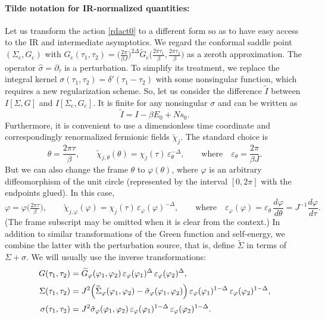 \documentclass[12pt]{article}
\newcommand{\cc}{\mathrm{c}}
\newcommand{\tI}{\tilde{I}}
\newcommand{\tG}{\widetilde{G}}
\newcommand{\tSig}{\widetilde{\Sigma}}
\newcommand{\tsig}{\tilde{\sigma}}
\newcommand{\vep}{\varepsilon}
\newcommand{\vp}{\varphi}
\begin{document}
\paragraph{Tilde notation for IR-normalized quantities:}
Let us transform the action \eqref{rdact0} to a different form so as to have easy access to the IR and intermediate asymptotics. We regard the conformal saddle point $(\Sigma_{\cc},G_{\cc})$ with $G_{\cc}(\tau_1,\tau_2)=\bigl(\frac{2\pi}{\beta J}\bigr)^{2\Delta}
\tG_{\cc}\bigl(\frac{2\pi\tau_1}{\beta},\frac{2\pi\tau_2}{\beta}\bigr)$ as a zeroth approximation. The operator $\hat{\sigma}=\partial_\tau$ is a perturbation. To simplify its treatment, we replace the integral kernel $\sigma(\tau_1,\tau_2)=\delta'(\tau_1-\tau_2)$ with some nonsingular function, which requires a new regularization scheme. So, let us consider the difference $\tI$ between $I[\Sigma,G]$ and $I[\Sigma_{\cc},G_{\cc}]$. It is finite for any nonsingular $\sigma$ and can be written as
\begin{equation}
\tI=I-\beta E_0+N s_0.
\end{equation}
Furthermore, it is convenient to use a dimensionless time coordinate and correspondingly renormalized fermionic fields $\widetilde{\chi}_{j}$. The standard choice is
\begin{equation}\label{theta_frame}
\theta=\frac{2\pi\tau}{\beta},\qquad
\widetilde{\chi}_{j,\theta}(\theta)=\chi_j(\tau)\,\vep_{\theta}^{-\Delta},\qquad
\text{where}\quad \vep_{\theta}=\frac{2\pi}{\beta J}.
\end{equation}
But we can also change the frame $\theta$ to $\vp(\theta)$, where $\vp$ is an arbitrary diffeomorphism of the unit circle (represented by the interval $[0,2\pi]$ with the endpoints glued). In this case,
\begin{equation}
\vp=\vp\bigl(\tfrac{2\pi\tau}{\beta}\bigr),\qquad
\widetilde{\chi}_{j,\vp}(\vp)=\chi_j(\tau)\,\vep_{\vp}(\vp)^{-\Delta},\qquad
\text{where}\quad
\vep_{\vp}(\vp)=\vep_{\theta}\,\frac{d\vp}{d\theta}=J^{-1}\frac{d\vp}{d\tau}.
\end{equation}
(The frame subscript may be omitted when it is clear from the context.) In addition to similar transformations of the Green function and self-energy, we combine the latter with the perturbation source, that is, define $\tSig$ in terms of $\Sigma+\sigma$. We will usually use the inverse transformations:
\begin{equation} \label{tquan}
\begin{aligned}
G(\tau_1,\tau_2) &=\tG_{\vp}(\vp_1,\vp_2)\,
\vep_{\vp}(\vp_1)^{\Delta}\,\vep_{\vp}(\vp_2)^{\Delta},
\\[2pt]
\Sigma(\tau_1,\tau_2)
&=J^2\Bigl(\tSig_{\vp}(\vp_1,\vp_2)-\tsig_{\vp}(\vp_1,\vp_2)\Bigr)\,
\vep_{\vp}(\vp_1)^{1-\Delta}\,\vep_{\vp}(\vp_2)^{1-\Delta},
\\[2pt]
\sigma(\tau_1,\tau_2) &=J^2\tsig_{\vp}(\vp_1,\vp_2)\,
\vep_{\vp}(\vp_1)^{1-\Delta}\,\vep_{\vp}(\vp_2)^{1-\Delta}.
\end{aligned}
\end{equation}
\end{document}
